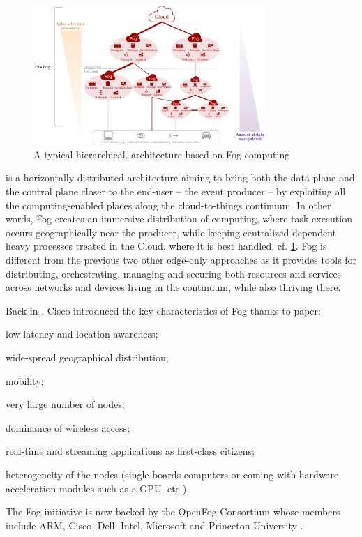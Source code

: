 \documentclass[11pt]{sdm}
\begin{document}
\begin{description}[leftmargin=10pt]
	\begin{figure}[t]
		\centering
		\includegraphics[width=0.78\textwidth]{./assets/FogArchitecture.drawio.png}
		\caption{A typical hierarchical, architecture based on Fog computing \cite{ieee_standards_association_ieee_2018}}
		\label{fig:fog_archi}
	\end{figure}

	\item[Fog computing] is a horizontally distributed architecture aiming to bring both the data plane and the control plane closer to the end-user -- the event producer -- by exploiting all the computing-enabled places along the cloud-to-things continuum. In other words, Fog creates an immersive distribution of computing, where task execution occurs geographically near the producer, while keeping centralized-dependent heavy processes treated in the Cloud, where it is best handled, cf. \cref{fig:fog_archi}. Fog is different from the previous two other edge-only approaches as it provides tools for distributing, orchestrating, managing and securing both resources and services across networks and devices living in the continuum, while also thriving there.

	Back in , Cisco introduced the key characteristics of Fog thanks to  paper:
	\begin{enumerate*}[(i)]
		\item low-latency and location awareness;
		\item wide-spread geographical distribution;
		\item mobility;
		\item very large number of nodes;
		\item dominance of wireless access;
		\item real-time and streaming applications as first-class citizens;
		\item heterogeneity of the nodes (single boards computers or coming with hardware acceleration modules such as a \gls{GPU}, etc.).
	\end{enumerate*}
	The Fog initiative is now backed by the OpenFog Consortium \cite{ieee_standards_association_ieee_2018} whose members include ARM, Cisco, Dell, Intel, Microsoft and Princeton University \cite{chiang_fog_2016}.
\end{description}
\end{document}

